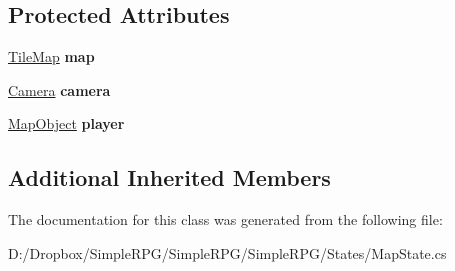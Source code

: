 \subsection*{Protected Attributes}
\begin{DoxyCompactItemize}
\item 
\hypertarget{class_simple_r_p_g_1_1_states_1_1_map_state_a39f94c5063719b3a3f7657e8ed17fed6}{\hyperlink{class_simple_r_p_g_1_1_tile_map}{Tile\+Map} {\bfseries map}}\label{class_simple_r_p_g_1_1_states_1_1_map_state_a39f94c5063719b3a3f7657e8ed17fed6}

\item 
\hypertarget{class_simple_r_p_g_1_1_states_1_1_map_state_a8b39dc14b2f3e3c3b8120bf31ec79b74}{\hyperlink{class_simple_r_p_g_1_1_camera}{Camera} {\bfseries camera}}\label{class_simple_r_p_g_1_1_states_1_1_map_state_a8b39dc14b2f3e3c3b8120bf31ec79b74}

\item 
\hypertarget{class_simple_r_p_g_1_1_states_1_1_map_state_a106c108b36c278592bd8b2a660b40949}{\hyperlink{class_simple_r_p_g_1_1_map_object}{Map\+Object} {\bfseries player}}\label{class_simple_r_p_g_1_1_states_1_1_map_state_a106c108b36c278592bd8b2a660b40949}

\end{DoxyCompactItemize}
\subsection*{Additional Inherited Members}


The documentation for this class was generated from the following file\+:\begin{DoxyCompactItemize}
\item 
D\+:/\+Dropbox/\+Simple\+R\+P\+G/\+Simple\+R\+P\+G/\+Simple\+R\+P\+G/\+States/Map\+State.\+cs\end{DoxyCompactItemize}
